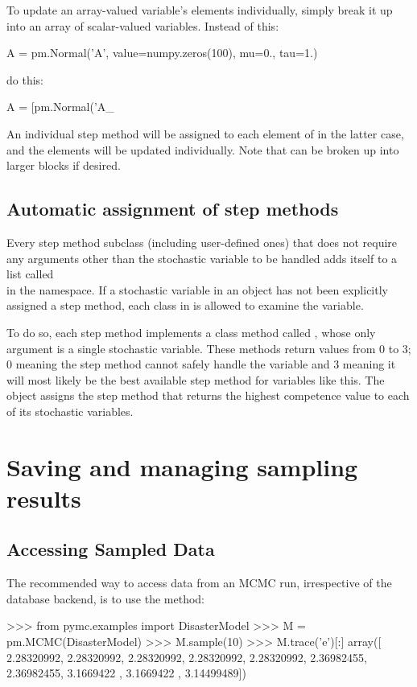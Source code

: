\documentclass[]{jss}
\begin{document}
To update an array-valued variable's elements individually, simply break it up into an array of scalar-valued variables. Instead of this:
\begin{CodeInput}
A = pm.Normal('A', value=numpy.zeros(100), mu=0., tau=1.)
\end{CodeInput}
do this:
\begin{CodeInput}
A = [pm.Normal('A_%
\end{CodeInput}
An individual step method will be assigned to each element of  in the latter case, and the elements will be updated individually. Note that  can be broken up into larger blocks if desired.

\subsection{Automatic assignment of step methods}
Every step method subclass (including user-defined ones) that does not require any  arguments other than the stochastic variable to be handled adds itself to a list called \\ in the  namespace. If a stochastic variable in an  object has not been explicitly assigned a step method, each class in  is allowed to examine the variable.

To do so, each step method implements a class method called , whose only argument is a single stochastic variable. These methods return values from 0 to 3; 0 meaning the step method cannot safely handle the variable and 3 meaning it will most likely be the best available step method for variables like this. The  object assigns the step method that returns the highest competence value to each of its stochastic variables.

\section[Sampling Results]{Saving and managing sampling results}
\label{chap:database}


\subsection{Accessing Sampled Data}
  \label{accessing-sampled-data}%


The recommended way to access data from an MCMC run, irrespective of the
database backend, is to use the  method:
%
\begin{CodeInput}
>>> from pymc.examples import DisasterModel
>>> M = pm.MCMC(DisasterModel)
>>> M.sample(10)
>>> M.trace('e')[:]
array([ 2.28320992,  2.28320992,  2.28320992,  2.28320992,  2.28320992,
        2.36982455,  2.36982455,  3.1669422 ,  3.1669422 ,  3.14499489])    
\end{CodeInput}
\end{document}
